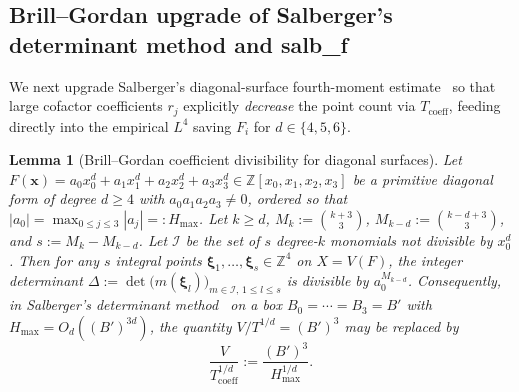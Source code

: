 \documentclass[11pt,a4paper]{amsart}
\theoremstyle{plain}
\newtheorem{lemma}[theorem]{Lemma}
\theoremstyle{definition}
\theoremstyle{remark}
\newcommand{\Z}{\mathbb{Z}}
\begin{document}
\subsection{Brill--Gordan upgrade of Salberger's determinant method and \textsf{salb\_f}}

We next upgrade Salberger's diagonal-surface fourth-moment estimate~\cite[Corollary~6.5]{Salberger2023} so that large cofactor coefficients $r_j$ explicitly \emph{decrease} the point count via $T_{\mathrm{coeff}}$, feeding directly into the empirical $L^4$ saving $F_i$ for $d \in \{4, 5, 6\}$.

\begin{lemma}[Brill--Gordan coefficient divisibility for diagonal surfaces]\label{lem:brill_gordan}
Let $F(\mathbf{x}) = a_0 x_0^d + a_1 x_1^d + a_2 x_2^d + a_3 x_3^d \in \Z[x_0,x_1,x_2,x_3]$ be a primitive diagonal form of degree $d \ge 4$ with $a_0 a_1 a_2 a_3 \neq 0$, ordered so that $|a_0| = \max_{0 \le j \le 3} |a_j| =: H_{\max}$. Let $k \ge d$, $M_k := \binom{k+3}{3}$, $M_{k-d} := \binom{k-d+3}{3}$, and $s := M_k - M_{k-d}$. Let $\mathcal{I}$ be the set of $s$ degree-$k$ monomials not divisible by $x_0^d$. Then for any $s$ integral points $\boldsymbol{\xi}_1,\dots,\boldsymbol{\xi}_s \in \Z^4$ on $X = V(F)$, the integer determinant $\Delta := \det\bigl(m(\boldsymbol{\xi}_l)\bigr)_{m \in \mathcal{I},\, 1 \le l \le s}$ is divisible by $a_0^{M_{k-d}}$. Consequently, in Salberger's determinant method~\cite[Lemma~1.11, Main Lemma~3.2, and Theorem~3.16]{Salberger2023} on a box $B_0 = \cdots = B_3 = B'$ with $H_{\max} = O_d((B')^{3d})$, the quantity $V / T^{1/d} = (B')^3$ may be replaced by
\[
  \frac{V}{T_{\mathrm{coeff}}^{1/d}} := \frac{(B')^3}{H_{\max}^{1/d}}.
\]
\end{lemma}
\end{document}
